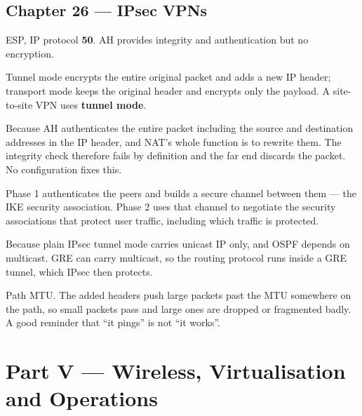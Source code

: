\subsection*{Chapter 26 --- IPsec VPNs}
\begin{tightnum}
  \item ESP, IP protocol \textbf{50}. AH provides integrity and authentication but
        no encryption.
  \item Tunnel mode encrypts the entire original packet and adds a new IP header;
        transport mode keeps the original header and encrypts only the payload. A
        site-to-site VPN uses \textbf{tunnel mode}.
  \item Because AH authenticates the entire packet including the source and
        destination addresses in the IP header, and NAT's whole function is to
        rewrite them. The integrity check therefore fails by definition and the
        far end discards the packet. No configuration fixes this.
  \item Phase 1 authenticates the peers and builds a secure channel between them
        --- the IKE security association. Phase 2 uses that channel to negotiate
        the security associations that protect user traffic, including which
        traffic is protected.
  \item Because plain IPsec tunnel mode carries unicast IP only, and OSPF depends
        on multicast. GRE can carry multicast, so the routing protocol runs inside
        a GRE tunnel, which IPsec then protects.
  \item Path MTU. The added headers push large packets past the MTU somewhere on
        the path, so small packets pass and large ones are dropped or fragmented
        badly. A good reminder that ``it pings'' is not ``it works''.
\end{tightnum}

\section*{Part V --- Wireless, Virtualisation and Operations}

